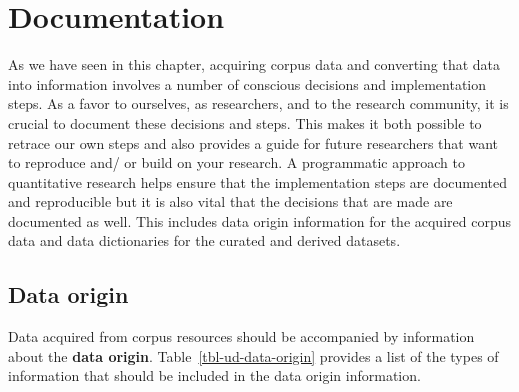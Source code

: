 \documentclass[
  letterpaper,
  DIV=11,
  numbers=noendperiod]{scrreport}
\theoremstyle{definition}
\theoremstyle{remark}
\begin{document}
\hypertarget{sec-ud-documentation}{%
\section{Documentation}\label{sec-ud-documentation}}

As we have seen in this chapter, acquiring corpus data and converting
that data into information involves a number of conscious decisions and
implementation steps. As a favor to ourselves, as researchers, and to
the research community, it is crucial to document these decisions and
steps. This makes it both possible to retrace our own steps and also
provides a guide for future researchers that want to reproduce and/ or
build on your research. A programmatic approach to quantitative research
helps ensure that the implementation steps are documented and
reproducible but it is also vital that the decisions that are made are
documented as well. This includes data origin information for the
acquired corpus data and data dictionaries for the curated and derived
datasets.

\hypertarget{sec-ud-data-origin}{%
\subsection{Data origin}\label{sec-ud-data-origin}}

Data acquired from corpus resources should be accompanied by information
about the \textbf{data origin}. Table~\ref{tbl-ud-data-origin} provides
a list of the types of information that should be included in the data
origin information.
\end{document}

